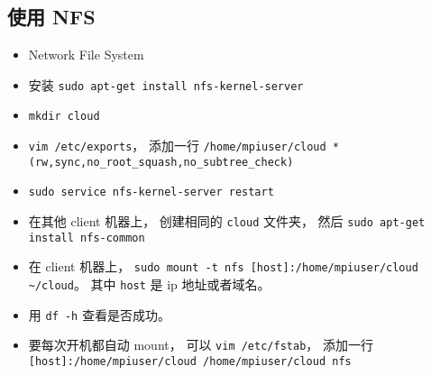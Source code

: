 \subsection{使用 NFS}
\begin{itemize}
\item Network File System
\item 安装 \verb|sudo apt-get install nfs-kernel-server|
\item \verb|mkdir cloud|
\item \verb|vim /etc/exports|， 添加一行 \verb|/home/mpiuser/cloud *(rw,sync,no_root_squash,no_subtree_check)|
\item \verb|sudo service nfs-kernel-server restart|
\item 在其他 client 机器上， 创建相同的 \verb|cloud| 文件夹， 然后 \verb|sudo apt-get install nfs-common|
\item 在 client 机器上， \verb|sudo mount -t nfs [host]:/home/mpiuser/cloud ~/cloud|。 其中 \verb|host| 是 ip 地址或者域名。
\item 用 \verb|df -h| 查看是否成功。
\item 要每次开机都自动 mount， 可以 \verb|vim /etc/fstab|， 添加一行 \verb|[host]:/home/mpiuser/cloud /home/mpiuser/cloud nfs|
\end{itemize}
